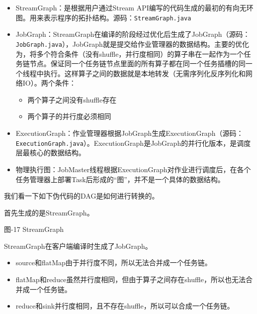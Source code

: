 \begin{itemize}
\tightlist
\item
  StreamGraph：是根据用户通过Stream
  API编写的代码生成的最初的有向无环图。用来表示程序的拓扑结构。源码：\texttt{StreamGraph.java}
\item
  JobGraph：StreamGraph在编译的阶段经过优化后生成了JobGraph（源码：\texttt{JobGraph.java}），JobGraph就是提交给作业管理器的数据结构。主要的优化为，将多个符合条件（没有shuffle，并行度相同）的算子串在一起作为一个{任务链节点}。保证同一个任务链节点里面的所有算子都在同一个任务插槽的同一个线程中执行。这样算子之间的数据就是本地转发（无需序列化反序列化和网络IO）。两个条件：

  \begin{itemize}
  \tightlist
  \item
    两个算子之间没有shuffle存在
  \item
    两个算子的并行度必须相同
  \end{itemize}
\item
  ExecutionGraph：作业管理器根据JobGraph生成ExecutionGraph（源码：\texttt{ExecutionGraph.java}）。ExecutionGraph是JobGraph的并行化版本，是调度层最核心的数据结构。
\item
  物理执行图：JobMaster线程根据ExecutionGraph对作业进行调度后，在各个任务管理器上部署Task后形成的``图''，并不是一个具体的数据结构。
\end{itemize}

我们看一下如下伪代码的DAG是如何进行转换的。

\begin{Shaded}
\begin{Highlighting}[]
\OperatorTok{(}\OperatorTok{)}
  \OperatorTok{(}\OperatorTok{)}
  \OperatorTok{()}
  \OperatorTok{(}\OperatorTok{)}
  \OperatorTok{(}\OperatorTok{)}
\end{Highlighting}
\end{Shaded}

首先生成的是StreamGraph。

图-17 StreamGraph

StreamGraph在客户端编译时生成了JobGraph。

\begin{itemize}
\tightlist
\item
  source和flatMap由于并行度不同，所以无法合并成一个任务链。
\item
  flatMap和reduce虽然并行度相同，但由于算子之间存在shuffle，所以也无法合并成一个任务链。
\item
  reduce和sink并行度相同，且不存在shuffle，所以可以合成一个任务链。
\end{itemize}

